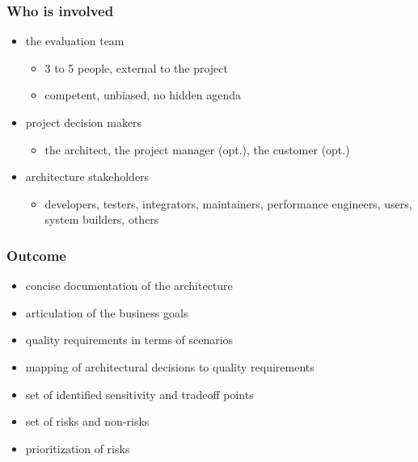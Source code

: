 \hypertarget{Who is involved}{%
\subsubsection{Who is involved}\label{participants}}

\begin{itemize}
\tightlist
\item
  the evaluation team

  \begin{itemize}
  \tightlist
  \item
    3 to 5 people, external to the project
  \item
    competent, unbiased, no hidden agenda
  \end{itemize}
\item
  project decision makers

  \begin{itemize}
  \tightlist
  \item
    the architect, the project manager (opt.), the customer (opt.)
  \end{itemize}
\item
  architecture stakeholders

  \begin{itemize}
  \tightlist
  \item
    developers, testers, integrators, maintainers, performance
    engineers, users, system builders, others
  \end{itemize}
\end{itemize}

\hypertarget{outcome}{%
\subsubsection{Outcome}\label{outcome}}

\begin{itemize}
\tightlist
\item
  concise documentation of the architecture
\item
  articulation of the business goals
\item
  quality requirements in terms of scenarios
\item
  mapping of architectural decisions to quality requirements
\item
  set of identified sensitivity and tradeoff points
\item
  set of risks and non-risks
\item
  prioritization of risks
\end{itemize}

